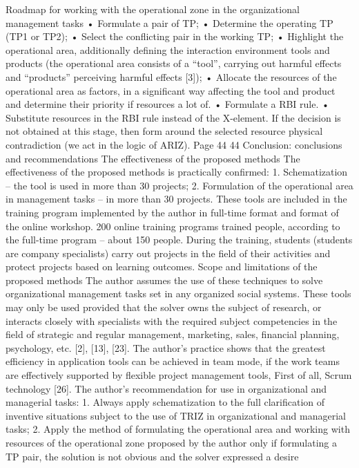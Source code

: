 Roadmap for working with the operational zone in the organizational
management tasks
• Formulate a pair of TP;
• Determine the operating TP (TP1 or TP2);
• Select the conflicting pair in the working TP;
• Highlight the operational area, additionally defining the interaction environment
tools and products (the operational area consists of a “tool”,
carrying out harmful effects and “products” perceiving
harmful effects [3]);
• Allocate the resources of the operational area as factors, in a significant way
affecting the tool and product and determine their priority if resources
a lot of.
• Formulate a RBI rule.
• Substitute resources in the RBI rule instead of the X-element. If the decision is not
obtained at this stage, then form around the selected resource
physical contradiction (we act in the logic of ARIZ).
Page 44
44
Conclusion: conclusions and recommendations
The effectiveness of the proposed methods
The effectiveness of the proposed methods is practically confirmed:
1. Schematization -- the tool is used in more than 30 projects;
2. Formulation of the operational area in management tasks -- in more than 30
projects.
These tools are included in the training program implemented by the author in full-time
format and format of the online workshop. 200 online training programs trained
people, according to the full-time program -- about 150 people. During the training, students
(students are company specialists) carry out projects in the field of their
activities and protect projects based on learning outcomes.
Scope and limitations of the proposed methods
The author assumes the use of these techniques to solve organizational
management tasks set in any organized social systems.
These tools may only be used provided that
the solver owns the subject of research, or interacts closely with
specialists with the required subject competencies in the field of
strategic and regular management, marketing, sales, financial
planning, psychology, etc. [2], [13], [23].
The author’s practice shows that the greatest efficiency in application
tools can be achieved in team mode, if the work
teams are effectively supported by flexible project management tools,
First of all, Scrum technology [26].
The author's recommendation for use in organizational and managerial tasks:
1. Always apply schematization to the full clarification of inventive
situations subject to the use of TRIZ in organizational and managerial
tasks;
2. Apply the method of formulating the operational area and working with resources
of the operational zone proposed by the author only if
formulating a TP pair, the solution is not obvious and the solver expressed a desire
